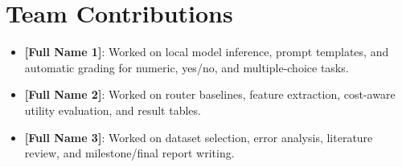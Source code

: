 \documentclass{article}
\begin{document}
\section{Team Contributions}

\begin{itemize}
    \item \textbf{[Full Name 1]}: Worked on local model inference, prompt templates, and automatic grading for numeric, yes/no, and multiple-choice tasks.
    \item \textbf{[Full Name 2]}: Worked on router baselines, feature extraction, cost-aware utility evaluation, and result tables.
    \item \textbf{[Full Name 3]}: Worked on dataset selection, error analysis, literature review, and milestone/final report writing.
\end{itemize}



\end{document}
